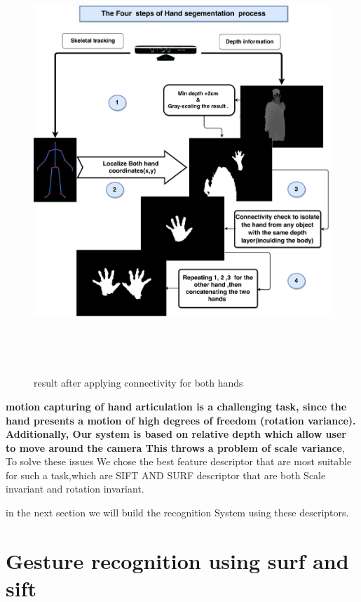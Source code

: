  \begin{figure}[H]
\centering
\includegraphics[width=18cm, height=16cm ]{img/preprocessing.pdf}
\caption{result after applying connectivity for both hands  }
\label{fig:preprocessing}
\end{figure}

\textbf{ motion capturing of hand articulation is a challenging task, since the hand presents a motion of high degrees of freedom (rotation variance). Additionally, Our system is based on relative depth which allow user to move around the camera This throws a problem of scale variance}, To solve these issues We chose the best feature descriptor that are most suitable for such a task,which are  SIFT AND SURF descriptor that are both Scale invariant and rotation invariant.

in the next section we will build the recognition System using these descriptors.

\section{ Gesture recognition using surf and sift}


